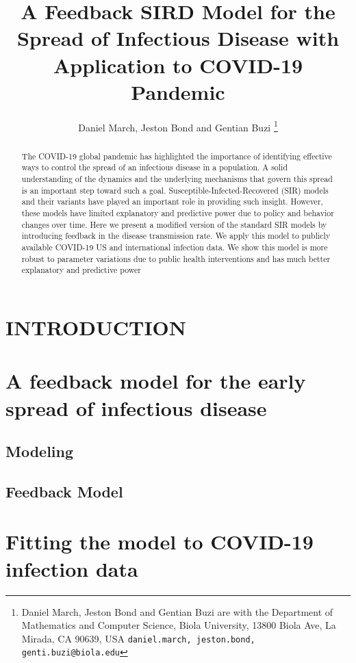 \documentclass[letterpaper, 10 pt, conference]{ieeeconf}  %
\title{\LARGE \bf
A Feedback SIRD Model  for the Spread of Infectious Disease with Application to COVID-19 Pandemic
}
\author{Daniel March, Jeston Bond and Gentian Buzi%
\thanks{Daniel March, Jeston Bond and Gentian Buzi are with the Department of Mathematics and Computer Science,
       Biola University, 13800 Biola Ave, La Mirada, CA 90639, USA
        {\tt\small daniel.march, jeston.bond, genti.buzi@biola.edu}}%
}
\begin{document}
\maketitle
\thispagestyle{empty}
\pagestyle{empty}


\begin{abstract}

The COVID-19 global pandemic has highlighted the importance of identifying effective ways to control the spread of an infectious disease in a population. A solid understanding of the dynamics and the underlying mechanisms that govern this spread is an important step toward such a goal. Susceptible-Infected-Recovered (SIR) models and their variants have played an important role in providing such insight. However, these models have limited explanatory and predictive power due to policy and behavior changes over time. Here we present a modified version of the standard SIR models by introducing feedback in the disease transmission rate. We apply this model to publicly available COVID-19 US and international infection data. We show this model is more robust to parameter variations due to public health interventions and has much better explanatory and predictive power


\end{abstract}


\section{INTRODUCTION}


\section{A feedback model for the early spread of infectious disease}

\subsection{Modeling}

 

\subsection{Feedback Model}



\section{Fitting the model to COVID-19 infection data}
\end{document}
